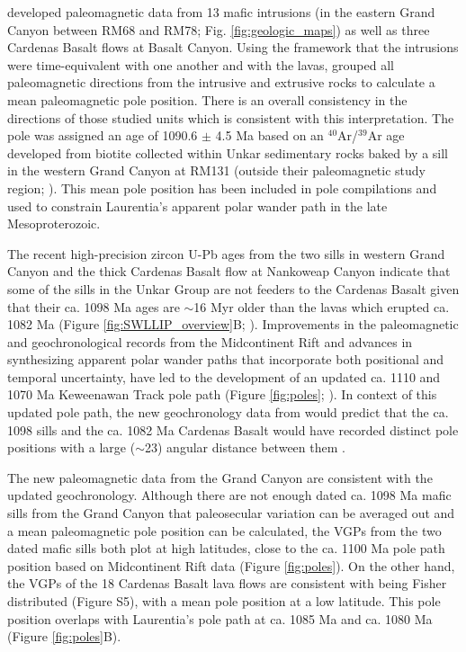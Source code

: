 \cite{Weil2003a} developed paleomagnetic data from 13 mafic intrusions (in the eastern Grand Canyon between RM68 and RM78; Fig. \ref{fig:geologic_maps}) as well as three Cardenas Basalt flows at Basalt Canyon. Using the framework that the intrusions were time-equivalent with one another and with the lavas, \cite{Weil2003a} grouped all paleomagnetic directions from the intrusive and extrusive rocks to calculate a mean paleomagnetic pole position. There is an overall consistency in the directions of those studied units which is consistent with this interpretation. The pole was assigned an age of 1090.6 $\pm$ 4.5 Ma based on an $^{40}$Ar/$^{39}$Ar age developed from biotite collected within Unkar sedimentary rocks baked by a sill in the western Grand Canyon at RM131 (outside their paleomagnetic study region; \cite{Weil2003a}). This mean pole position has been included in pole compilations \cite[e.g.][]{Evans2021a} and used to constrain Laurentia's apparent polar wander path in the late Mesoproterozoic. 

The recent high-precision zircon U-Pb ages from the two sills in western Grand Canyon and the thick Cardenas Basalt flow at Nankoweap Canyon indicate that some of the sills in the Unkar Group are not feeders to the Cardenas Basalt given that their ca. 1098 Ma ages are $\sim$16 Myr older than the lavas which erupted ca. 1082 Ma (Figure \ref{fig:SWLLIP_overview}B; \cite{Mohr2024a}). Improvements in the paleomagnetic and geochronological records from the Midcontinent Rift \cite[e.g.][]{Tauxe2009a, Kulakov2013b, Fairchild2017a, Swanson-Hysell2019a} and advances in synthesizing apparent polar wander paths that incorporate both positional and temporal uncertainty, have led to the development of an updated ca. 1110 and 1070 Ma Keweenawan Track pole path (Figure \ref{fig:poles}; \cite{Swanson-Hysell2019a, Rose2022a}). In context of this updated pole path, the new geochronology data from \cite{Mohr2024a} would predict that the ca. 1098 sills and the ca. 1082 Ma Cardenas Basalt would have recorded distinct pole positions with a large ($\sim$23\textdegree) angular distance between them \citep{Swanson-Hysell2019a, Rose2022a}. 

The new paleomagnetic data from the Grand Canyon are consistent with the updated geochronology. Although there are not enough dated ca. 1098 Ma mafic sills from the Grand Canyon that paleosecular variation can be averaged out and a mean paleomagnetic pole position can be calculated, the VGPs from the two dated mafic sills both plot at high latitudes, close to the ca. 1100 Ma pole path position based on Midcontinent Rift data (Figure \ref{fig:poles}). On the other hand, the VGPs of the 18 Cardenas Basalt lava flows are consistent with being Fisher distributed (Figure S5), with a mean pole position at a low latitude. This pole position overlaps with Laurentia's pole path at ca. 1085 Ma and ca. 1080 Ma (Figure \ref{fig:poles}B). 

